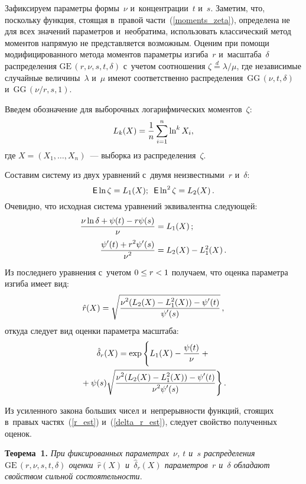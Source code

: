 \begin{multicols}{2}
Зафиксируем параметры формы~$\nu$ и~концентрации~$t$ и~$s$. Заметим, что, 
поскольку функция, стоящая в~правой части~(\ref{moments_zeta}), определена не 
для всех значений параметров и~необратима, использовать классический метод 
моментов напрямую не представляется возможным. Оценим при помощи 
модифицированного метода моментов параметры изгиба~$r$ и~масштаба~$\delta$ 
распределения $\mathrm{GE}\,(r,\nu,s,t,\delta)$ с~учетом соотношения 
$\zeta\stackrel{d}{=}\lambda/\mu$, где независимые случайные величины~$\lambda$ 
и~$\mu$ имеют соответственно распределения~$\mathrm{GG}\,(\nu,t,\delta)$ 
и~$\mathrm{GG}\,(\nu/r,s,1)$.

Введем обозначение для выборочных логарифмических моментов~$\zeta$:
$$
L_k(X)=\displaystyle\frac{\displaystyle 1\mathstrut}{\displaystyle n\mathstrut}\sum\limits_{i=1}^n\ln^k X_i,
$$
где $X=(X_1,\ldots,X_n)$~--- выборка из распределения~$\zeta$.

Составим систему из двух уравнений с~двумя неизвестными~$r$ и~$\delta$:
$$
{\sf E}\ln\zeta=L_1(X);\enskip {\sf E}\ln^2\zeta=L_2(X)\,.
$$
Очевидно, что исходная система уравнений эквивалентна следующей:
\begin{align}
\label{first_eq}
\displaystyle\frac{\displaystyle \nu\ln\delta+\psi(t)-r\psi(s)\mathstrut}{\displaystyle \nu\mathstrut}&=L_1(X)\,;
\\
\label{second_eq}
\displaystyle\frac{\displaystyle \psi'(t)+r^2\psi'(s)\mathstrut}{\displaystyle \nu^2\mathstrut}&=L_2(X)-L_1^2(X)\,.
\end{align}
Из последнего уравнения с~учетом $0\hm\le r\hm<1$ получаем, что оценка параметра 
изгиба имеет вид:
\begin{equation}
\label{r_est}
{\hat r}(X)=
\sqrt{\displaystyle\frac{\displaystyle \nu^2(L_2(X)-L_1^2(X))-{\psi'(t)}\mathstrut}{\displaystyle \psi'(s)\mathstrut}}\,,
\end{equation}
откуда следует вид оценки параметра масштаба:
\begin{multline}
\label{delta_r_est}
{\hat \delta}_r(X)=\exp\Bigg\{
L_1(X)-\displaystyle\frac{\displaystyle \psi(t)\mathstrut}{\displaystyle \nu\mathstrut}+{}\\
{}+\psi(s)\sqrt{\displaystyle\frac{\displaystyle \nu^2(L_2(X)-L_1^2(X))-
{\psi'(t)}\mathstrut}{\displaystyle \nu^2\psi'(s)\mathstrut}}\Bigg\}\,.
\end{multline}

Из усиленного закона больших чисел и~непрерывности функций, стоящих в~правых 
частях~(\ref{r_est}) и~(\ref{delta_r_est}), следует свойство полученных оценок.

\smallskip

\noindent
\textbf{Теорема~1.}
\textit{При фиксированных параметрах~$\nu$, $t$ и~$s$ распределения 
$\mathrm{GE}\,(r,\nu,s,t,\delta)$ оценки~${\hat r}(X)$ и~${\hat \delta}_r(X)$ параметров~$r$ 
и~$\delta$ обладают свойством сильной состоятельности}.



\end{multicols}
